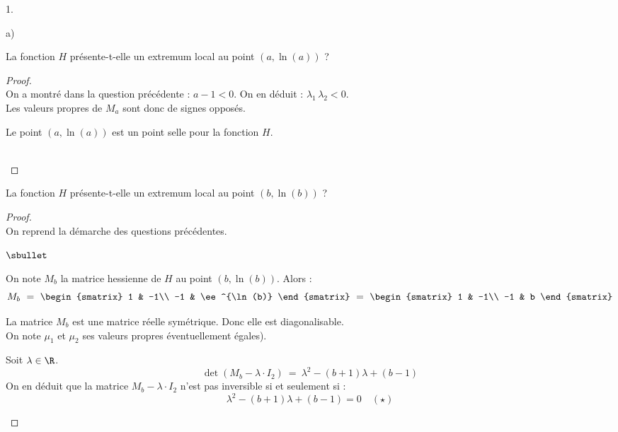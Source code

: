 \begin{noliste}{1.}
\begin{noliste}{a)}
    
    \item La fonction $H$ présente-t-elle un extremum local au point
    $(a,\ln(a))$ ?
    
    \begin{proof}~\\
      On a montré dans la question précédente : $a-1<0$. On en déduit : 
      $\lambda_1 \, \lambda_2 <0$.\\
      Les valeurs propres de $M_a$ sont donc de signes opposés.
      
      \begin{remark}
        Le point $(a,\ln(a))$ est un point selle pour la fonction $H$.
      \end{remark}~\\[-1.4cm]
    \end{proof}
  \end{noliste}
  
  
  \item La fonction $H$ présente-t-elle un extremum local au point 
  $(b,\ln(b))$ ?
  
  \begin{proof}~\\
    On reprend la démarche des questions précédentes.
    \begin{noliste}{$\sbullet$}
      \item On note $M_b$ la matrice hessienne de $H$ au point 
      $(b,\ln(b))$. Alors :
      \[
        M_b \ = \
        \begin{smatrix}
          1 & -1\\
          -1 & \ee^{\ln(b)}
        \end{smatrix}
        \ = \
        \begin{smatrix}
          1 & -1\\
          -1 & b
        \end{smatrix}
      \]
      
      \item La matrice $M_b$ est une matrice réelle symétrique. Donc 
      elle est diagonalisable.\\
      On note $\mu_1$ et $\mu_2$ ses valeurs propres éventuellement 
      égales).
      
      \item Soit $\lambda \in \R$.
      \[
        \det(M_b - \lambda \cdot I_2) \ = \ \lambda^2 - (b+1) \lambda 
        + (b-1)
      \]
      On en déduit que la matrice $M_b - \lambda \cdot I_2$ n'est pas 
      inversible si et seulement si :
      \[
        \lambda^2 - (b+1) \lambda + (b-1) = 0 \quad (\star)
      \]
      

\end{noliste}
\end{proof}
\end{noliste}
